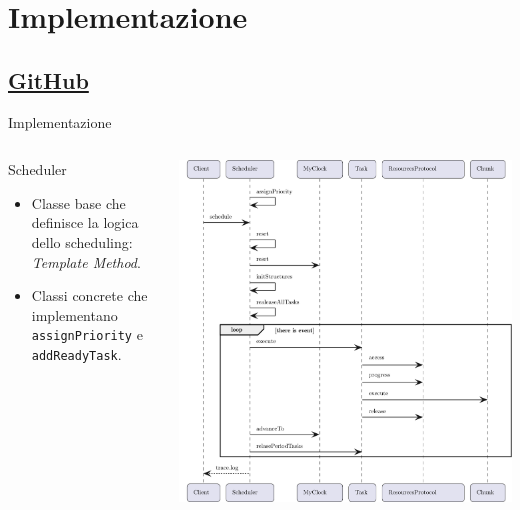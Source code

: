 \section{Implementazione}
\subsection{\href{https://github.com/edoardosarri24/real-time-scheduling-simulator.git}{GitHub}}

\begin{frame}{Implementazione}
    \begin{columns}
        \begin{column}{.4\textwidth}
            \begin{block}{Scheduler}
                \begin{itemize}
                    \item Classe base che definisce la logica dello scheduling: \textit{Template Method}.
                    \item Classi concrete che implementano \texttt{assignPriority} e \texttt{addReadyTask}.
                \end{itemize}
            \end{block}
        \end{column}
        \begin{column}{.6\textwidth}
            \centering
            \includegraphics[width=\textwidth]{images/3-implementazione/sequence diagram.pdf}
        \end{column}
    \end{columns}
\end{frame}

